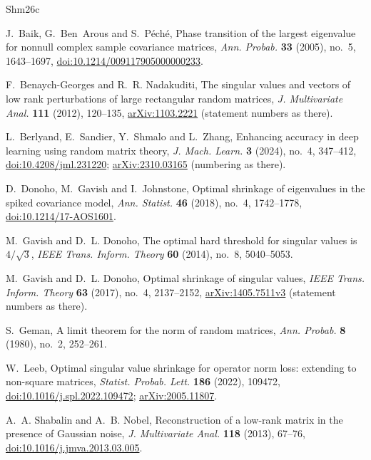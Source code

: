\documentclass[11pt]{amsart}
\theoremstyle{remark}
\numberwithin{equation}{section}
\begin{document}
\begin{thebibliography}{Shm26c}

J.~Baik, G.~Ben~Arous and S.~P\'ech\'e, Phase transition of the largest eigenvalue for nonnull complex sample covariance matrices, \emph{Ann. Probab.} \textbf{33} (2005), no.~5, 1643--1697, \href{https://doi.org/10.1214/009117905000000233}{doi:10.1214/009117905000000233}.

F.~Benaych-Georges and R.~R. Nadakuditi, The singular values and vectors of low rank perturbations of large rectangular random matrices, \emph{J. Multivariate Anal.} \textbf{111} (2012), 120--135, \href{https://arxiv.org/abs/1103.2221}{arXiv:1103.2221} (statement numbers as there).

L.~Berlyand, E.~Sandier, Y.~Shmalo and L.~Zhang, Enhancing accuracy in deep learning using random matrix theory, \emph{J. Mach. Learn.} \textbf{3} (2024), no.~4, 347--412, \href{https://doi.org/10.4208/jml.231220}{doi:10.4208/jml.231220}; \href{https://arxiv.org/abs/2310.03165}{arXiv:2310.03165} (numbering as there).

D.~Donoho, M.~Gavish and I.~Johnstone, Optimal shrinkage of eigenvalues in the spiked covariance model, \emph{Ann. Statist.} \textbf{46} (2018), no.~4, 1742--1778, \href{https://doi.org/10.1214/17-AOS1601}{doi:10.1214/17-AOS1601}.

M.~Gavish and D.~L. Donoho, The optimal hard threshold for singular values is $4/\sqrt3$, \emph{IEEE Trans. Inform. Theory} \textbf{60} (2014), no.~8, 5040--5053.

M.~Gavish and D.~L. Donoho, Optimal shrinkage of singular values, \emph{IEEE Trans. Inform. Theory} \textbf{63} (2017), no.~4, 2137--2152, \href{https://arxiv.org/abs/1405.7511v3}{arXiv:1405.7511v3} (statement numbers as there).

S.~Geman, A limit theorem for the norm of random matrices, \emph{Ann. Probab.} \textbf{8} (1980), no.~2, 252--261.

W.~Leeb, Optimal singular value shrinkage for operator norm loss: extending to non-square matrices, \emph{Statist. Probab. Lett.} \textbf{186} (2022), 109472, \href{https://doi.org/10.1016/j.spl.2022.109472}{doi:10.1016/j.spl.2022.109472}; \href{https://arxiv.org/abs/2005.11807}{arXiv:2005.11807}.

A.~A. Shabalin and A.~B. Nobel, Reconstruction of a low-rank matrix in the presence of Gaussian noise, \emph{J. Multivariate Anal.} \textbf{118} (2013), 67--76, \href{https://doi.org/10.1016/j.jmva.2013.03.005}{doi:10.1016/j.jmva.2013.03.005}.


\end{thebibliography}
\end{document}
